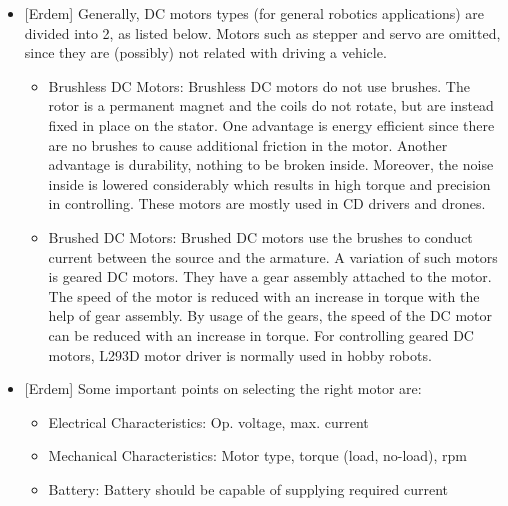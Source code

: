 \documentclass[a4paper,12pt]{article}
\begin{document}
\begin{itemize}
	
	\item {[Erdem]} Generally, DC motors types (for general robotics applications) are divided into 2, as listed below. Motors such as stepper and servo are omitted, since they are (possibly) not related with driving a vehicle.
		\begin{itemize}
			\item Brushless DC Motors: Brushless DC motors do not use brushes. The rotor is a permanent magnet and the coils do not rotate, but are instead fixed in place on the stator. One advantage is energy efficient since there are no brushes to cause additional friction in the motor. Another advantage is durability, nothing to be broken inside. Moreover, the noise inside is lowered considerably which results in high torque  and precision in controlling. These motors are mostly used in CD drivers and drones.
			\item Brushed DC Motors: Brushed DC motors use the brushes to conduct current between the source and the armature. A variation of such motors is geared DC motors. They have a gear assembly attached to the motor. The speed of the motor is reduced with an increase in torque with the help of gear assembly. By usage of the gears, the speed of the DC motor can be reduced with an increase in torque. For controlling geared DC motors, L293D motor driver is normally used in hobby robots.
		\end{itemize}
	\item {[Erdem]} Some important points on selecting the right motor are:
		\begin{itemize}
			\item Electrical Characteristics: Op. voltage, max. current
			\item Mechanical Characteristics: Motor type, torque (load, no-load), rpm
			\item Battery: Battery should be capable of supplying required current
		

\end{itemize}
\end{itemize}
\end{document}
